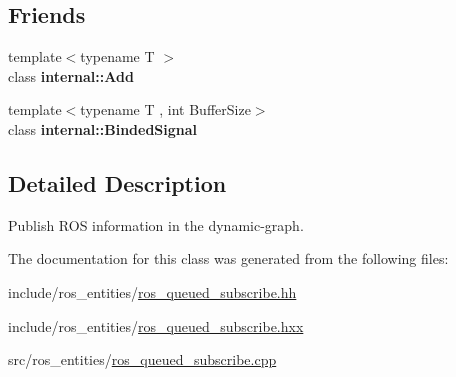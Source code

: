 \subsection*{Friends}
\begin{DoxyCompactItemize}
\item 
\mbox{\label{classdynamic__graph_1_1RosQueuedSubscribe_aff86e359edc93019ec7be05f8207a40d}} 
{\footnotesize template$<$typename T $>$ }\\class {\bfseries internal\+::\+Add}
\item 
\mbox{\label{classdynamic__graph_1_1RosQueuedSubscribe_a9df2fc52f650be6e579db5873effd4e8}} 
{\footnotesize template$<$typename T , int Buffer\+Size$>$ }\\class {\bfseries internal\+::\+Binded\+Signal}
\end{DoxyCompactItemize}


\subsection{Detailed Description}
Publish R\+OS information in the dynamic-\/graph. 

The documentation for this class was generated from the following files\+:\begin{DoxyCompactItemize}
\item 
include/ros\+\_\+entities/\hyperlink{ros__queued__subscribe_8hh}{ros\+\_\+queued\+\_\+subscribe.\+hh}\item 
include/ros\+\_\+entities/\hyperlink{ros__queued__subscribe_8hxx}{ros\+\_\+queued\+\_\+subscribe.\+hxx}\item 
src/ros\+\_\+entities/\hyperlink{ros__queued__subscribe_8cpp}{ros\+\_\+queued\+\_\+subscribe.\+cpp}\end{DoxyCompactItemize}
